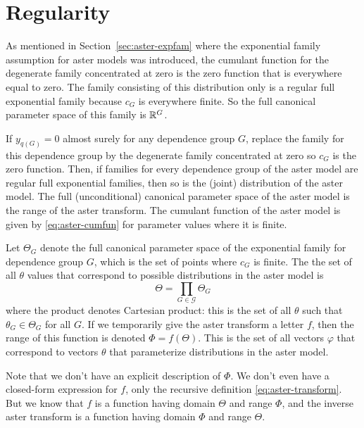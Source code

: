 
\chapter{Regularity}
\label{app:regular}

As mentioned in Section~\ref{sec:aster-expfam} where the exponential
family assumption for aster models was introduced, the cumulant function
for the degenerate family concentrated at zero is the zero function
that is everywhere equal to zero.  The family consisting of this distribution
only is a regular full exponential family because $c_G$ is everywhere finite.
So the full canonical parameter space of this family is $\mathbb{R}^G$.

\begin{theorem} \label{th:regular}
If $y_{q(G)} = 0$ almost surely for any dependence group $G$, replace
the family for this dependence group by the degenerate family concentrated
at zero so $c_G$ is the zero function.
Then, if families for every dependence group of the aster model are regular full
exponential families, then so is the (joint) distribution of the aster model.
The full (unconditional) canonical parameter space of the aster model
is the range of the aster transform.  The cumulant function of the
aster model is given by \eqref{eq:aster-cumfun} for parameter values where
it is finite.
\end{theorem}

Let $\Theta_G$ denote the full canonical parameter space of the exponential
family for dependence group $G$, which is the set of points where $c_G$
is finite.  The the set of all $\theta$ values that correspond to possible
distributions in the aster model is
\begin{equation} \label{eq:reg-prod}
   \Theta = \prod_{G \in \mathcal{G}} \Theta_G
\end{equation}
where the product denotes Cartesian product: this is the set of all $\theta$
such that $\theta_G \in \Theta_G$ for all $G$.
If we temporarily give the aster transform a letter $f$, then
the range of this function is denoted $\Phi = f(\Theta)$.
This is the set of all vectors $\varphi$ that correspond to vectors $\theta$
that parameterize distributions in the aster model.

Note that we don't have an explicit description of $\Phi$.
We don't even have a closed-form expression for $f$, only the recursive
definition \eqref{eq:aster-transform}.  But we know that $f$ is a function
having domain $\Theta$ and range $\Phi$, and the inverse aster transform
is a function having domain $\Phi$ and range $\Theta$.

